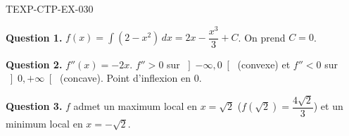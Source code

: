 \begin{corrige}{TEXP-CTP-EX-030}

\textbf{Question 1.} $f(x) = \int (2 - x^2)\,dx = 2x - \dfrac{x^3}{3} + C$. On prend $C = 0$.


\textbf{Question 2.} $f''(x) = -2x$. $f'' > 0$ sur $\left]-\infty, 0\right[$ (convexe) et $f'' < 0$ sur $\left]0, +\infty\right[$ (concave). Point d'inflexion en $0$.

\textbf{Question 3.} $f$ admet un maximum local en $x = \sqrt{2}$ ($f(\sqrt{2}) = \dfrac{4\sqrt{2}}{3}$) et un minimum local en $x = -\sqrt{2}$.

\end{corrige}
